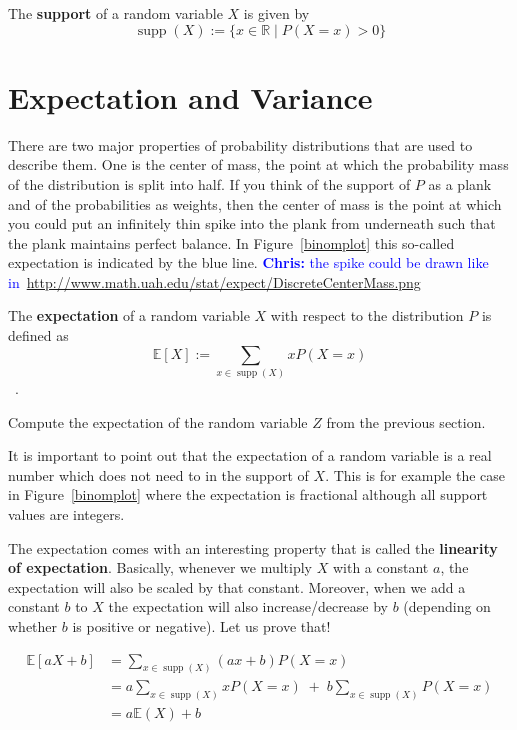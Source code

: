 \documentclass[a4paper,11pt,leqno]{report}
\newcommand{\chris}[1]{ \textcolor{blue}{\textbf{Chris:} #1}}
\newcommand{\supp}{\operatorname{supp}}
\newcommand{\E}{\mathbb{E}}
\begin{document}
\begin{Definition}
The \textbf{support} of a random variable $ X $ is given by
$$ \supp(X) := \{x \in \mathbb{R} \mid P(X=x)>0 \} $$
\end{Definition}




\section{Expectation and Variance}

There are two major properties of probability distributions that are used to describe them. One is the center of mass, the point
at which the probability mass of the distribution is split into half. If you think of the support of $ P $ as a plank and 
of the probabilities as weights, then the center of mass is the point at which you could put an infinitely thin spike into the
plank from underneath such that the plank maintains perfect balance. In Figure~\ref{binomplot} this so-called expectation
is indicated by the blue line. \chris{the spike could be drawn like in~\url{http://www.math.uah.edu/stat/expect/DiscreteCenterMass.png}}

\begin{Definition}
The \textbf{expectation} of a random variable $ X $ with respect to the distribution $ P $ is defined as
$$ \E[X] := \sum_{x \in \supp(X)} x P(X=x) $$ \, .
\end{Definition}

\begin{Exercise}
Compute the expectation of the random variable $ Z $ from the previous section.
\end{Exercise}

It is important to point out that the expectation of a random variable is a real number  which does not need to in the support of $ X $. This is for example the case in Figure~\ref{binomplot} where the
expectation is fractional although all support values are integers.

The expectation comes with an interesting property that is called the \textbf{linearity of expectation}. Basically, whenever we multiply $ X $ with a constant $ a $, the expectation will also be scaled by that constant. Moreover, when we add a constant $ b $
to $ X $ the expectation will also increase/decrease by $ b $ (depending on whether $ b $ is positive or negative). Let us
prove that!

\begin{align}
\E[aX+b] &= \sum_{x \in \supp(X)} (ax+b) P(X=x) \\
&= a \!\! \sum_{x \in \supp(X)} x P(X=x) \; + \; b \!\!\!\! \sum_{x \in \supp(X)} P(X=x)\\
&= a \E(X) + b \label{sumToOne}
\end{align}
\end{document}
